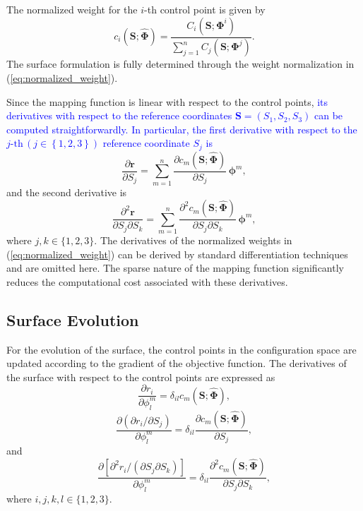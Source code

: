 \documentclass[journal]{IEEEtran}
\theoremstyle{definition}
\begin{document}
The normalized weight for the $i$-th control point is given by
\begin{equation}
  c_i(\mathbf{S}; \hat{\mathbf{\Phi}}) = \frac{C_i(\mathbf{S}; \mathbf{\Phi}^i)}{\sum_{j=1}^{n} C_j(\mathbf{S}; \mathbf{\Phi}^j)}.
  \label{eq:normalized_weight}
\end{equation}
The surface formulation is fully determined through the weight normalization in (\ref{eq:normalized_weight}).  

Since the mapping function is linear with respect to the control points, \textcolor{blue}{its derivatives with respect to the reference coordinates $\mathbf{S} = (S_1, S_2, S_3)$ can be computed straightforwardly. In particular, the first derivative with respect to the $j{\text{-th}} \,(j\in\left\{1,2,3\right\})$ reference coordinate $S_j$ is}
\begin{equation}
  \frac{\partial \mathbf{r}}{\partial S_j} = \sum_{m=1}^n \frac{\partial c_m(\mathbf{S}; \hat{\mathbf{\Phi}})}{\partial S_j}\,\boldsymbol{\phi}^m,
\end{equation}
and the second derivative is
\begin{equation}
  \frac{\partial^2 \mathbf{r}}{\partial S_j \partial S_k} = \sum_{m=1}^n \frac{\partial^2 c_m(\mathbf{S}; \hat{\mathbf{\Phi}})}{\partial S_j \partial S_k}\,\boldsymbol{\phi}^m,
\end{equation}
where $j,k \in \{1,2,3\}$.
The derivatives of the normalized weights in (\ref{eq:normalized_weight}) can be derived by standard differentiation techniques and are omitted here. The sparse nature of the mapping function significantly reduces the computational cost associated with these derivatives.

\subsection{Surface Evolution}
\label{sec:sphere_mapping:surface_evolution}
For the evolution of the surface, the control points in the configuration space are updated according to the gradient of the objective function. The derivatives of the surface with respect to the control points are expressed as
\begin{equation}
  \frac{\partial r_i}{\partial \phi^m_l} = \delta_{il} c_m (\mathbf{S}; \hat{\mathbf{\Phi}}),
\end{equation}
\begin{equation}
  \frac{\partial\left(\partial r_i / \partial S_j\right)}{\partial \phi^m_l} = \delta_{il} \frac{\partial c_m(\mathbf{S}; \hat{\mathbf{\Phi}})}{\partial S_j},
\end{equation}
and
\begin{equation}
  \frac{\partial\left[\partial^2 r_i / \left(\partial S_j \partial S_k\right)\right]}{\partial \phi^m_l} = \delta_{il} \frac{\partial^2 c_m(\mathbf{S}; \hat{\mathbf{\Phi}})}{\partial S_j \partial S_k},
\end{equation}
where $i,j,k,l \in \{1,2,3\}$.
\end{document}
